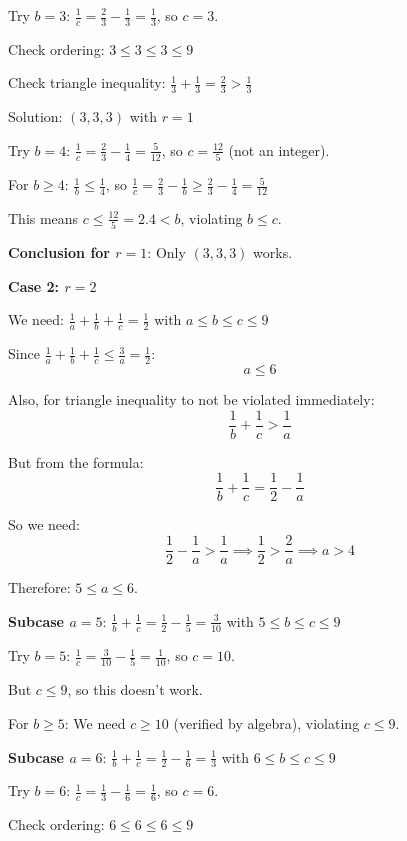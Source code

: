 \documentclass[12pt]{article}
\begin{document}
\begin{solutionbox}
Try $b = 3$: $\frac{1}{c} = \frac{2}{3} - \frac{1}{3} = \frac{1}{3}$, so $c = 3$.

Check ordering: $3 \leq 3 \leq 3 \leq 9$ \checkmark

Check triangle inequality: $\frac{1}{3} + \frac{1}{3} = \frac{2}{3} > \frac{1}{3}$ \checkmark

Solution: $(3, 3, 3)$ with $r = 1$ \checkmark

Try $b = 4$: $\frac{1}{c} = \frac{2}{3} - \frac{1}{4} = \frac{5}{12}$, so $c = \frac{12}{5}$ (not an integer).

For $b \geq 4$: $\frac{1}{b} \leq \frac{1}{4}$, so $\frac{1}{c} = \frac{2}{3} - \frac{1}{b} \geq \frac{2}{3} - \frac{1}{4} = \frac{5}{12}$

This means $c \leq \frac{12}{5} = 2.4 < b$, violating $b \leq c$.

\textbf{Conclusion for $r = 1$}: Only $(3, 3, 3)$ works.

\textbf{Case 2: $r = 2$}

We need: $\frac{1}{a} + \frac{1}{b} + \frac{1}{c} = \frac{1}{2}$ with $a \leq b \leq c \leq 9$

Since $\frac{1}{a} + \frac{1}{b} + \frac{1}{c} \leq \frac{3}{a} = \frac{1}{2}$:
$$a \leq 6$$

Also, for triangle inequality to not be violated immediately:
$$\frac{1}{b} + \frac{1}{c} > \frac{1}{a}$$

But from the formula:
$$\frac{1}{b} + \frac{1}{c} = \frac{1}{2} - \frac{1}{a}$$

So we need:
$$\frac{1}{2} - \frac{1}{a} > \frac{1}{a} \implies \frac{1}{2} > \frac{2}{a} \implies a > 4$$

Therefore: $5 \leq a \leq 6$.

\textbf{Subcase $a = 5$}: $\frac{1}{b} + \frac{1}{c} = \frac{1}{2} - \frac{1}{5} = \frac{3}{10}$ with $5 \leq b \leq c \leq 9$

Try $b = 5$: $\frac{1}{c} = \frac{3}{10} - \frac{1}{5} = \frac{1}{10}$, so $c = 10$.

But $c \leq 9$, so this doesn't work.

For $b \geq 5$: We need $c \geq 10$ (verified by algebra), violating $c \leq 9$.

\textbf{Subcase $a = 6$}: $\frac{1}{b} + \frac{1}{c} = \frac{1}{2} - \frac{1}{6} = \frac{1}{3}$ with $6 \leq b \leq c \leq 9$

Try $b = 6$: $\frac{1}{c} = \frac{1}{3} - \frac{1}{6} = \frac{1}{6}$, so $c = 6$.

Check ordering: $6 \leq 6 \leq 6 \leq 9$ \checkmark


\end{solutionbox}
\end{document}
